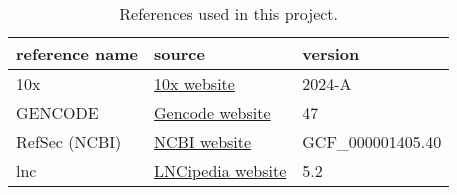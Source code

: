 \begin{table}[htbp]
  \centering
  \begin{tabular}{l|ll}
    \toprule
    reference name & source & version \\
    \midrule
    10x & \href{https://www.10xgenomics.com/support/software/cell-ranger/downloads#reference-downloads}{10x website} & 2024-A \\
    GENCODE & \href{https://www.gencodegenes.org/human/}{Gencode website} & 47  \\
    RefSec (NCBI) & \href{https://ftp.ncbi.nlm.nih.gov/genomes/refseq/vertebrate_mammalian/Homo_sapiens/latest_assembly_versions/GCF_000001405.40_GRCh38.p14/}{NCBI website} & GCF\_000001405.40 \\
    lnc & \href{https://lncipedia.org/download}{LNCipedia website} & 5.2 \\
    \bottomrule
  \end{tabular}
  \caption{References used in this project.}
  \label{tab:references}
\end{table}
